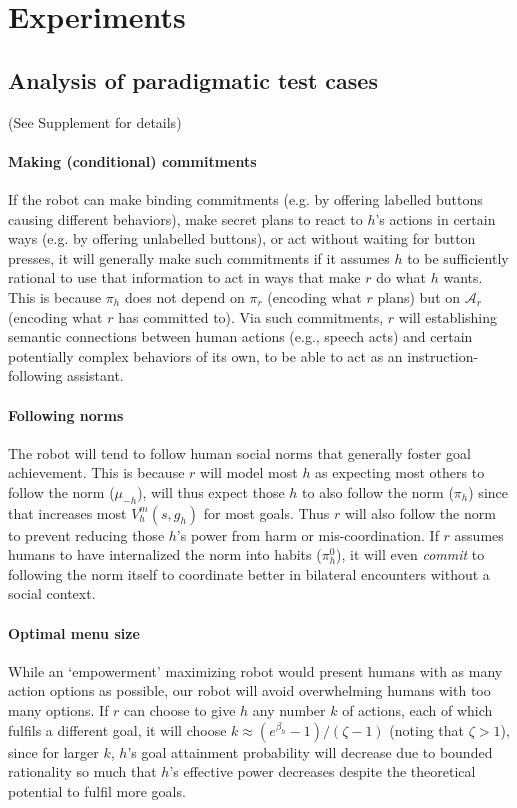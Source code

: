 \documentclass[letterpaper]{article} %
\def\A{\mathcal{A}}
\begin{document}
\section{Experiments}

\subsection{Analysis of paradigmatic test cases}

(See Supplement for details)
\paragraph{Making (conditional) commitments}
If the robot can make binding commitments (e.g. by offering labelled buttons causing different behaviors), make secret plans to react to $h$'s actions in certain ways (e.g. by offering unlabelled buttons), or act without waiting for button presses, it will generally make such commitments if it assumes $h$ to be sufficiently rational to use that information to act in ways that make $r$ do what $h$ wants.
This is because $\pi_h$ does not depend on $\pi_r$ (encoding what $r$ plans) but on $\A_r$ (encoding what $r$ has committed to).
Via such commitments, $r$ will establishing semantic connections between human actions (e.g., speech acts) and certain potentially complex behaviors of its own, to be able to act as an instruction-following assistant.

\paragraph{Following norms}
The robot will tend to follow human social norms that generally foster goal achievement. 
This is because $r$ will model most $h$ as expecting most others to follow the norm ($\mu_{-h}$), will thus expect those $h$ to also follow the norm ($\pi_h$) since that increases most $V^m_h(s,g_h)$ for most goals. 
Thus $r$ will also follow the norm to prevent reducing those $h$'s power from harm or mis-coordination.
If $r$ assumes humans to have internalized the norm into habits ($\pi^0_h$), it will even {\em commit} to following the norm itself to coordinate better in bilateral encounters without a social context.

\paragraph{Optimal menu size} 
While an `empowerment' maximizing robot would present humans with as many action options as possible,
our robot will avoid overwhelming humans with too many options. 
If $r$ can choose to give $h$ any number $k$ of actions, each of which fulfils a different goal, it will choose $k\approx (e^{\beta_h}-1) / (\zeta-1)$ (noting that $\zeta>1$), since for larger $k$, $h$'s goal attainment probability will decrease due to bounded rationality so much that $h$'s effective power decreases despite the theoretical potential to fulfil more goals.
\end{document}
